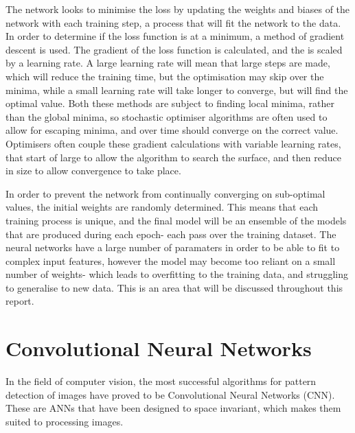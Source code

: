 \noindent The network looks to minimise the loss by updating the weights and biases of the network with each training step, a process that will fit the network to the data. In order to determine if the loss function is at a minimum, a method of gradient descent is used. The gradient of the loss function is calculated, and the is scaled by a learning rate. A large learning rate will mean that large steps are made, which will reduce the training time, but the optimisation may skip over the minima, while a small learning rate will take longer to converge, but will find the optimal value. Both these methods are subject to finding local minima, rather than the global minima, so stochastic optimiser algorithms are often used to allow for escaping minima, and over time should converge on the correct value. Optimisers often couple these gradient calculations with  variable learning rates, that start of large to allow the algorithm to search the surface, and then reduce in size to allow convergence to take place. \medskip

\noindent In order to prevent the network from continually converging on sub-optimal values, the initial weights are randomly determined. This means that each training process is unique, and the final model will be an ensemble of the models that are produced during each epoch- each pass over the training dataset. The neural networks have a large number of paramaters in order to be able to fit to complex input features, however the model may become too reliant on a small number of weights- which leads to overfitting to the training data, and struggling to generalise to new data. This is an area that will be discussed throughout this report. \medskip

\section{Convolutional Neural Networks}

\noindent In the field of computer vision, the most successful algorithms for pattern detection of images have proved to be Convolutional Neural Networks (CNN). These are ANNs that have been designed to space invariant, which makes them suited to processing images.

